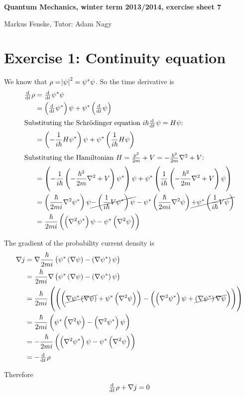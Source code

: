 \documentclass[a4paper,german,12pt,smallheadings]{scrartcl}
\begin{document}
\allowdisplaybreaks %
\begin{center}
\bfseries %
\sffamily %
\vspace{-40pt}
Quantum Mechanics, winter term 2013/2014, exercise sheet 7

Markus Fenske, Tutor: Adam Nagy
\vspace{-10pt}
\end{center}

\section*{Exercise 1: Continuity equation}
We know that $\rho = \envert{\psi}^2 = \psi^*\psi$. So the time derivative is
\begin{align*}
  \od{}{t} \rho &= \od{}{t} \psi^*\psi \\
                         &= \del{\od{}{t} \psi^*} \psi + \psi^* \del{\od{}{t} \psi} \\
  \intertext{Substituting the Schrödinger equation $i \hbar \od{}{t} \psi = H \psi$:}
  &= \del{-\frac{1}{i\hbar} H \psi^*} \psi + \psi^* \del{\frac{1}{i \hbar} H \psi} \\
  \intertext{Substituting the Hamiltonian $H = \frac{p^2}{2m} + V = -\frac{\hbar^2}{2m} \nabla^2 + V$:}
  &= \del{-\frac{1}{i\hbar} \del{-\frac{\hbar^2}{2m} \nabla^2 + V} \psi^*} \psi + \psi^* \del{\frac{1}{i \hbar} \del{-\frac{\hbar^2}{2m} \nabla^2 + V} \psi} \\
  &= \del{\frac{\hbar}{2 mi} \nabla^2 \psi^*}\psi \cancel{- \del{\frac{1}{i \hbar} V \psi^*}\psi} - \psi^* \del{\frac{\hbar}{2 mi} \nabla^2 \psi} \cancel{+ \psi^* \del{\frac{1}{i \hbar} V \psi}} \\
  &= \frac{\hbar}{2 mi} \del{\del{\nabla^2 \psi^*}\psi - \psi^* \del{\nabla^2 \psi}}
\end{align*}

The gradient of the probability current density is
\begin{align*}
  \nabla j &= \nabla \frac{\hbar}{2mi} \del{\psi^* \del{\nabla \psi} - \del{\nabla \psi^*} \psi} \\
           &= \frac{\hbar}{2mi} \nabla \del{\psi^* \del{\nabla \psi} - \del{\nabla \psi^*} \psi} \\
           &= \frac{\hbar}{2mi} \del{\del{\del{\cancel{\nabla \psi^* \del{\nabla \psi}} + \psi^* \del{\nabla^2 \psi}} - \del{\del{\nabla^2 \psi^*} \psi + \cancel{\del{\nabla \psi^*} \nabla \psi}}}} \\
           &= \frac{\hbar}{2mi} \del{\psi^* \del{\nabla^2 \psi} - \del{\nabla^2 \psi^*} \psi} \\
           &= -\frac{\hbar}{2mi} \del{\del{\nabla^2 \psi^*}\psi - \psi^* \del{\nabla^2 \psi}} \\
           &= -\od{}{t} \rho
\end{align*}

Therefore
\begin{equation*}
  \od{}{t} \rho + \nabla j = 0
\end{equation*}
\end{document}

